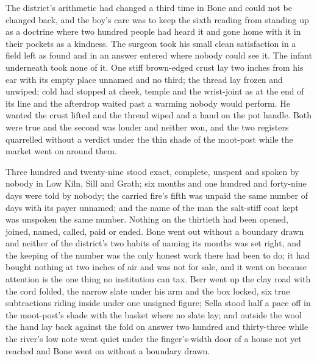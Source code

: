 The district's arithmetic had changed a third time in Bone and could not be changed back, and the boy's care was to keep the sixth reading from standing up as a doctrine where two hundred people had heard it and gone home with it in their pockets as a kindness. The surgeon took his small clean satisfaction in a field left as found and in an answer entered where nobody could see it. The infant underneath took none of it. One stiff brown-edged crust lay two inches from his ear with its empty place unnamed and no third; the thread lay frozen and unwiped; cold had stopped at cheek, temple and the wrist-joint as at the end of its line and the afterdrop waited past a warming nobody would perform. He wanted the crust lifted and the thread wiped and a hand on the pot handle. Both were true and the second was louder and neither won, and the two registers quarrelled without a verdict under the thin shade of the moot-post while the market went on around them.

Three hundred and twenty-nine stood exact, complete, unspent and spoken by nobody in Low Kiln, Sill and Grath; six months and one hundred and forty-nine days were told by nobody; the carried fire's fifth was unpaid the same number of days with its payer unnamed; and the name of the man the salt-stiff coat kept was unspoken the same number. Nothing on the thirtieth had been opened, joined, named, called, paid or ended. Bone went out without a boundary drawn and neither of the district's two habits of naming its months was set right, and the keeping of the number was the only honest work there had been to do; it had bought nothing at two inches of air and was not for sale, and it went on because attention is the one thing no institution can tax. Berr went up the clay road with the cord folded, the narrow slate under his arm and the box locked, six true subtractions riding inside under one unsigned figure; Sella stood half a pace off in the moot-post's shade with the basket where no slate lay; and outside the wool the hand lay back against the fold on answer two hundred and thirty-three while the river's low note went quiet under the finger's-width door of a house not yet reached and Bone went on without a boundary drawn.
